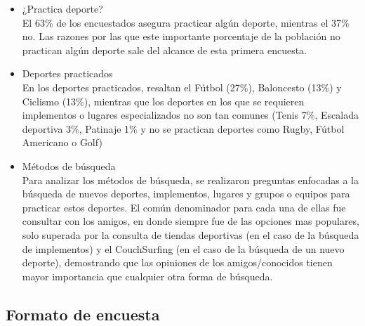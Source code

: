 \begin{itemize}
  \item ¿Practica deporte? \\
  El 63\% de los encuestados asegura practicar algún deporte, mientras el 37\% no. Las razones por las que este importante porcentaje de la población no practican algún deporte sale del alcance de esta primera encuesta.
  \item Deportes practicados \\
  En los deportes practicados, resaltan el Fútbol (27\%), Baloncesto (13\%) y Ciclismo (13\%), mientras que los deportes en los que se requieren implementos o lugares especializados no son tan comunes (Tenis 7\%, Escalada deportiva 3\%, Patinaje 1\% y no se practican deportes como Rugby, Fútbol Americano o Golf)
  \item Métodos de búsqueda \\
  Para analizar los métodos de búsqueda, se realizaron preguntas enfocadas a la búsqueda de nuevos deportes, implementos, lugares y grupos o equipos para practicar estos deportes. El común denominador para cada una de ellas fue consultar con los amigos, en donde siempre fue de las opciones mas populares, solo superada por la consulta de tiendas deportivas (en el caso de la búsqueda de implementos) y el CouchSurfing (en el caso de la búsqueda de un nuevo deporte), demostrando que las opiniones de los amigos/conocidos tienen mayor importancia que cualquier otra forma de búsqueda.
\end{itemize}


\subsection{Formato de encuesta}

